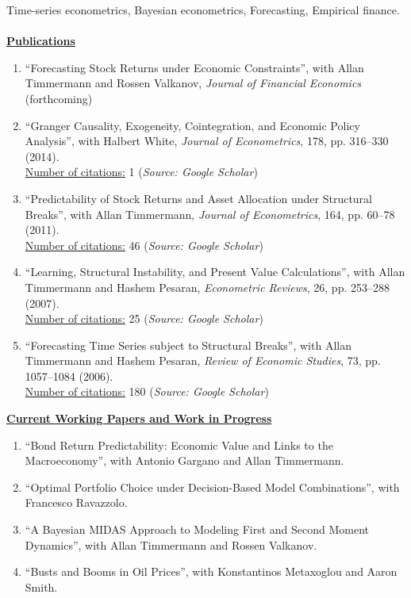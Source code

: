\documentclass[12pt]{article}
\begin{document}
Time-series econometrics, Bayesian econometrics, Forecasting, Empirical finance.\\ \\
\underline{\textbf{Publications}}
\begin{enumerate}	
	\item ``Forecasting Stock Returns under Economic Constraints'', with Allan Timmermann and Rossen Valkanov, \emph{Journal of Financial Economics} (forthcoming)
	
	\item ``Granger Causality, Exogeneity, Cointegration, and Economic Policy Analysis'', with Halbert White, \emph{Journal of Econometrics}, 178, pp. 316--330 (2014). \\
	\underline{Number of citations:} 1 (\emph{Source: Google Scholar})
	
	\item ``Predictability of Stock Returns and Asset Allocation under Structural Breaks'', with Allan Timmermann, \emph{Journal of Econometrics}, 164, pp. 60--78 (2011). \\
	\underline{Number of citations:} 46 (\emph{Source: Google Scholar})
	
	\item ``Learning, Structural Instability, and Present Value Calculations'', with Allan Timmermann and Hashem Pesaran, \emph{Econometric Reviews}, 26, pp. 253--288 (2007). \\
	\underline{Number of citations:} 25 (\emph{Source: Google Scholar})

	\item ``Forecasting Time Series subject to Structural Breaks'', with Allan Timmermann and Hashem Pesaran, \emph{Review of Economic Studies}, 73, pp. 1057--1084 (2006). \\
	\underline{Number of citations:} 180 (\emph{Source: Google Scholar})

    \setcounter{enumTemp}{\theenumi}
 \end{enumerate}
\underline{\textbf{Current Working Papers and Work in Progress}}
\begin{enumerate}
	\setcounter{enumi}{\theenumTemp}
	\item ``Bond Return Predictability: Economic Value and Links to the Macroeconomy'', with Antonio Gargano and Allan Timmermann.
	\item ``Optimal Portfolio Choice under Decision-Based Model Combinations'', with Francesco Ravazzolo.
	\item ``A Bayesian MIDAS Approach to Modeling First and Second Moment Dynamics'', with Allan Timmermann and Rossen Valkanov.
	\item ``Busts and Booms in Oil Prices'', with Konstantinos Metaxoglou  and Aaron Smith.
\end{enumerate}
\end{document}
